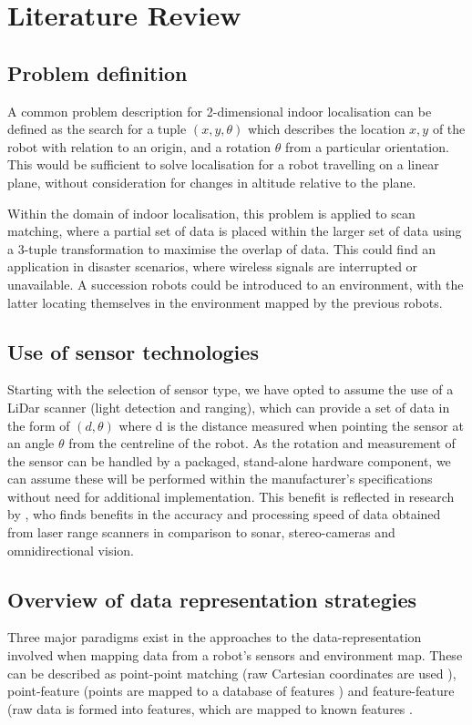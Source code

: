 \documentclass[authoryearcitations]{UoYCSproject}
\begin{document}
\chapter{Literature Review}

\section{Problem definition}
A common problem description for 2-dimensional indoor localisation can be defined as the search for a tuple $(x, y, \theta)$ which describes the location $x, y$ of the robot with relation to an origin, and a rotation $\theta$ from a particular orientation. This would be sufficient to solve localisation for a robot travelling on a linear plane, without consideration for changes in altitude relative to the plane.

Within the domain of indoor localisation, this problem is applied to scan matching, where a partial set of data is placed within the larger set of data using a 3-tuple transformation to maximise the overlap of data. This could find an application in disaster scenarios, where wireless signals are interrupted or unavailable. A succession robots could be introduced to an environment, with the latter locating themselves in the environment mapped by the previous robots.

\section{Use of sensor technologies}
Starting with the selection of sensor type, we have opted to assume the use of a LiDar scanner (light detection and ranging), which can provide a set of data in the form of $(d, \theta)$ where d is the distance measured when pointing the sensor at an angle $\theta$ from the centreline of the robot. As the rotation and measurement of the sensor can be handled by a packaged, stand-alone hardware component, we can assume these will be performed within the manufacturer's specifications without need for additional implementation. This benefit is reflected in research by \citet{Lingemann2005-hm}, who finds benefits in the accuracy and processing speed of data obtained from laser range scanners in comparison to sonar, stereo-cameras and omnidirectional vision.

\section{Overview of data representation strategies}
Three major paradigms exist in the approaches to the data-representation involved when mapping data from a robot's sensors and environment map. These can be described as point-point matching (raw Cartesian coordinates are used \cite{Lu1997-zv}), point-feature (points are mapped to a database of features \cite{Censi2008-ik}) and feature-feature (raw data is formed into features, which are mapped to known features \cite{Reina2000-vq}. 
\end{document}
